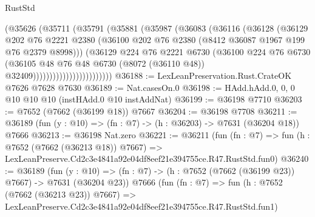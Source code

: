 \begin{lexlean}{RustStd}
\begin{coremodule}
                              (@35626
                                (@35711
                                  (@35791
                                    (@35881
                                      (@35987
                                        (@36083
                                          (@36116
                                            (@36128
                                              (@36129
                                                @202
                                                @76
                                                @2221
                                                @2380
                                                (@36100
                                                  @202
                                                  @76
                                                  @2380
                                                  (@8412 @36087 @1967 @199 @76 @2379 @8998)))
                                              (@36129
                                                @224
                                                @76
                                                @2221
                                                @6730
                                                (@36100
                                                  @224
                                                  @76
                                                  @6730
                                                  (@36105
                                                    @48
                                                    @76
                                                    @48
                                                    @6730
                                                    (@8072 (@36110 @48))
                                                    @32409))))))))))))))))))))))))
@36188 := LexLeanPreservation.Rust.CrateOK @7626 @7628 @7630
@36189 := Nat.casesOn.{0}
@36198 := HAdd.hAdd.{0, 0, 0} @10 @10 @10 (instHAdd.{0} @10 instAddNat)
@36199 := @36198 @7710
@36203 := @7652 (@7662 (@36199 @18)) @7667
@36204 := @36198 @7708
@36211 := @36189 (fun (y : @10) => (fn : @7) -> (h : @36203) -> @7631 (@36204 @18)) @7666
@36213 := @36198 Nat.zero
@36221 := @36211
    (fun (fn : @7) =>
    fun (h : @7652 (@7662 (@36213 @18)) @7667) =>
    LexLeanPreserve.Cd2c3e4841a92e04df8eef21e394755ce.R47.RustStd.fun0)
@36240 := @36189
    (fun (y : @10) => (fn : @7) -> (h : @7652 (@7662 (@36199 @23)) @7667) -> @7631 (@36204 @23))
    @7666
    (fun (fn : @7) =>
    fun (h : @7652 (@7662 (@36213 @23)) @7667) =>
    LexLeanPreserve.Cd2c3e4841a92e04df8eef21e394755ce.R47.RustStd.fun1)

\end{coremodule}
\end{lexlean}
